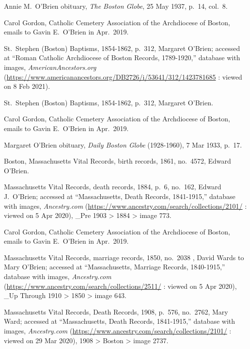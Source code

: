 \begin{thebibliography}{999}
Annie M.\ O'Brien obituary, \textit{The Boston Globe}, 25 May 1937, p.\ 14, col.\ 8.

Carol Gordon, Catholic Cemetery Association of the Archdiocese of Boston, emails to Gavin E.\ O'Brien in Apr.\ 2019.

St.\ Stephen (Boston) Baptisms, 1854-1862, p.\ 312, Margaret O'Brien; accessed at ``Roman Catholic Archdiocese of Boston Records, 1789-1920,'' database with images, \textit{AmericanAncestors.org} (\url{https://www.americanancestors.org/DB2726/i/53641/312/1423781685} : viewed on 8 Feb 2021).

St.\ Stephen (Boston) Baptisms, 1854-1862, p.\ 312, Margaret O'Brien.

Carol Gordon, Catholic Cemetery Association of the Archdiocese of Boston, emails to Gavin E.\ O'Brien in Apr.\ 2019.

Margaret O'Brien obituary, \textit{Daily Boston Globe} (1928-1960), 7 Mar 1933, p.\ 17.

Boston, Massachusetts Vital Records, birth records, 1861, no.\ 4572, Edward O'Brien.

Massachusetts Vital Records, death records, 1884, p.\ 6, no.\ 162, Edward J.\ O'Brien; accessed at ``Massachusetts, Death Records, 1841-1915,'' database with images, \textit{Ancestry.com} (\url{https://www.ancestry.com/search/collections/2101/} : viewed on 5 Apr 2020), \_Pre 1903 > 1884 > image 773.	

Carol Gordon, Catholic Cemetery Association of the Archdiocese of Boston, emails to Gavin E.\ O'Brien in Apr.\ 2019.


Massachusetts Vital Records, marriage records, 1850, no.\ 2038 , David Wards to Mary O'Brien; accessed at ``Massachusetts, Marriage Records, 1840-1915,'' database with images, \textit{Ancestry.com} (\url{https://www.ancestry.com/search/collections/2511/} : viewed on 5 Apr 2020), \_Up Through 1910 > 1850 > image 643.

Massachusetts Vital Records, Death Records, 1908, p.\ 576, no.\ 2762, Mary Ward; accessed at ``Massachusetts, Death Records, 1841-1915,'' database with images, \textit{Ancestry.com} (\url{https://www.ancestry.com/search/collections/2101/} : viewed on 29 Mar 2020), 1908 > Boston > image 2737.


\end{thebibliography}
